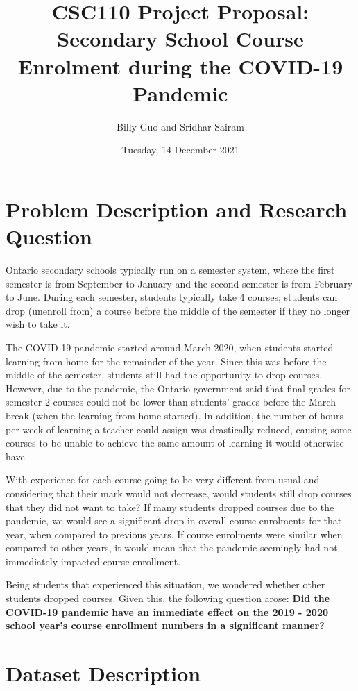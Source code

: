 \documentclass[fontsize=11pt]{article}
\title{CSC110 Project Proposal: Secondary School Course Enrolment during the COVID-19 Pandemic}
\author{Billy Guo and Sridhar Sairam}
\date{Tuesday, 14 December 2021}
\begin{document}
\maketitle

\section*{Problem Description and Research Question}  %

Ontario secondary schools typically run on a semester system, where the first semester is from September to January and the second semester is from February to June. During each semester, students typically take 4 courses; students can drop (unenroll from) a course before the middle of the semester if they no longer wish to take it.

The COVID-19 pandemic started around March 2020, when students started learning from home for the remainder of the year. Since this was before the middle of the semester, students still had the opportunity to drop courses. However, due to the pandemic, the Ontario government said that final grades for semester 2 courses could not be lower than students’ grades before the March break (when the learning from home started). In addition, the number of hours per week of learning a teacher could assign was drastically reduced, causing some courses to be unable to achieve the same amount of learning it would otherwise have.

With experience for each course going to be very different from usual and considering that their mark would not decrease, would students still drop courses that they did not want to take? If many students dropped courses due to the pandemic, we would see a significant drop in overall course enrolments for that year, when compared to previous years. If course enrolments were similar when compared to other years, it would mean that the pandemic seemingly had not immediately impacted course enrollment.

Being students that experienced this situation, we wondered whether other students dropped courses. Given this, the following question arose:
\textbf{Did the COVID-19 pandemic have an immediate effect on the 2019 - 2020 school year’s course enrollment numbers in a significant manner?}

\section*{Dataset Description}  %
\end{document}
